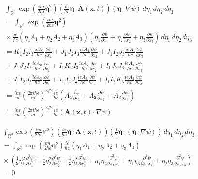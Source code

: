 \documentclass[12pt]{article}
\newcommand\INT{\int_{\mathbb R^3}}
\begin{document}
\begin{align*}
&
\INT\exp\left(\frac{im}{2\hbar\epsilon}\boldsymbol\eta^2\right)
\left(\frac{ie}{\hbar c}\boldsymbol\eta\cdot\mathbf A(\mathbf x,t)\right)
(\boldsymbol\eta\cdot\nabla\psi)
\,d\eta_1\,d\eta_2\,d\eta_3
\\
&{}
=\INT\exp\left(\frac{im}{2\hbar\epsilon}\boldsymbol\eta^2\right)
\\
&{}\times
\frac{ie}{\hbar c}
(\eta_1A_1+\eta_2A_2+\eta_3A_3)
\left(
 \eta_1\frac{\partial\psi}{\partial x_1}
+\eta_2\frac{\partial\psi}{\partial x_2}
+\eta_3\frac{\partial\psi}{\partial x_3}
\right)
\,d\eta_1\,d\eta_2\,d\eta_3
\\
&{}
=K_1 I_2 I_3 \frac{ieA_1}{\hbar c} \frac{\partial\psi}{\partial x_1}
+J_1 J_2 I_3 \frac{ieA_1}{\hbar c} \frac{\partial\psi}{\partial x_2}
+J_1 I_2 J_3 \frac{ieA_1}{\hbar c} \frac{\partial\psi}{\partial x_3}
\\
&{}
+J_1 J_2 I_3 \frac{ieA_2}{\hbar c} \frac{\partial\psi}{\partial x_1}
+I_1 K_2 I_3 \frac{ieA_2}{\hbar c} \frac{\partial\psi}{\partial x_2}
+I_1 J_2 J_3 \frac{ieA_2}{\hbar c} \frac{\partial\psi}{\partial x_3}
\\
&{}
+J_1 I_2 J_3 \frac{ieA_3}{\hbar c} \frac{\partial\psi}{\partial x_1}
+I_1 J_2 J_3 \frac{ieA_3}{\hbar c} \frac{\partial\psi}{\partial x_2}
+I_1 I_2 K_3 \frac{ieA_3}{\hbar c} \frac{\partial\psi}{\partial x_3}
\\
&{}
=\frac{i\hbar\epsilon}{m}\left(\frac{2\pi i\hbar\epsilon}{m}\right)^{3/2}\frac{ie}{\hbar c}
\left(
 A_1\frac{\partial\psi}{\partial x_1}
+A_2\frac{\partial\psi}{\partial x_2}
+A_3\frac{\partial\psi}{\partial x_3}
\right)
\\
&{}
=\frac{i\hbar\epsilon}{m}\left(\frac{2\pi i\hbar\epsilon}{m}\right)^{3/2}
\frac{ie}{\hbar c}(\mathbf A(\mathbf x,t)\cdot\nabla\psi)
\tag{11}
\end{align*}

\begin{align*}
&
\INT
\exp\left(\frac{im}{2\hbar\epsilon}\boldsymbol\eta^2\right)
\left(\frac{ie}{\hbar c}\boldsymbol\eta\cdot\mathbf A(\mathbf x,t)\right)
\left(\tfrac{1}{2}\boldsymbol\eta\cdot(\boldsymbol\eta\cdot\nabla\psi)\right)
\,d\eta_1\,d\eta_2\,d\eta_3
\\
&{}=\INT
\exp\left(\frac{im}{2\hbar\epsilon}\boldsymbol\eta^2\right)
\frac{ie}{\hbar c}(\eta_1A_1+\eta_2A_2+\eta_3A_3)
\\
&{}\times
\left(
 \tfrac{1}{2}\eta_1^2\frac{\partial^2\psi}{\partial x_1^2}
+\tfrac{1}{2}\eta_2^2\frac{\partial^2\psi}{\partial x_2^2}
+\tfrac{1}{2}\eta_3^2\frac{\partial^2\psi}{\partial x_3^2}
+\eta_1\eta_2\frac{\partial^2\psi}{\partial x_1x_2}
+\eta_1\eta_3\frac{\partial^2\psi}{\partial x_1x_3}
+\eta_2\eta_3\frac{\partial^2\psi}{\partial x_2x_3}
\right)
\\
&{}
=0
\tag{12}
\end{align*}
\end{document}
